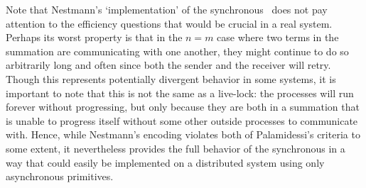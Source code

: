 Note that Nestmann's `implementation' of the synchronous \picalc\ does not pay attention to the efficiency questions that would be crucial in a real system.  Perhaps its worst property is that in the $n=m$ case where two terms in the summation are communicating with one another, they might continue to do so arbitrarily long and often since both the sender and the receiver will retry.  Though this represents potentially divergent behavior in some systems, it is important to note that this is not the same as a live-lock: the processes will run forever without progressing, but only because they are both in a summation that is unable to progress itself without some other outside processes to communicate with.  Hence, while Nestmann's encoding violates both of Palamidessi's criteria to some extent, it nevertheless provides the full behavior of the synchronous in a way that could easily be implemented on a distributed system using only asynchronous primitives.